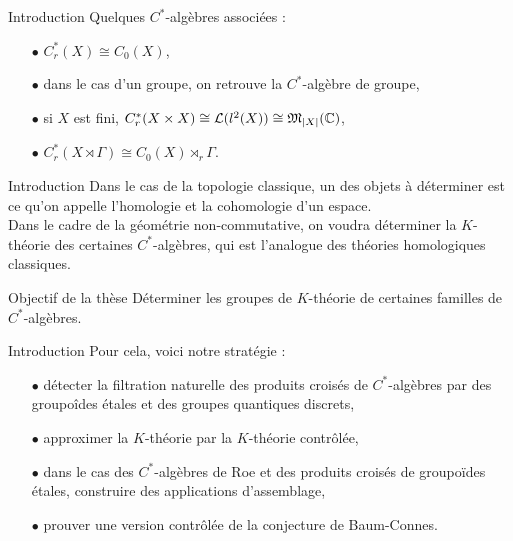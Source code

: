 \begin{frame}{Introduction}
Quelques $C^*$-algèbres associées :
\vspace{0.3 cm}
\begin{itemize}
\item[$\bullet$] $C_r^*(X)\cong C_0(X)$,
\vspace{0.3 cm}
\item[$\bullet$] dans le cas d'un groupe, on retrouve la $C^*$-algèbre de groupe,
\vspace{0.3 cm}
\item[$\bullet$] si $X$ est fini, $C^*_r(X\times X) \cong \mathcal L (l^2(X)) \cong \mathfrak M_{|X|}(\mathbb C)$,
\vspace{0.3 cm}
\item[$\bullet$] $C^*_r(X\rtimes \Gamma) \cong C_0(X)\rtimes_r \Gamma$.
\end{itemize}
\end{frame}

\begin{frame}{Introduction}
Dans le cas de la topologie classique, un des objets à déterminer est ce qu'on appelle l'homologie et la cohomologie d'un espace.\\
\vspace{0.3 cm}
Dans le cadre de la géométrie non-commutative, on voudra déterminer la $K$-théorie des certaines $C^*$-algèbres, qui est l'analogue des théories homologiques classiques. 
\vspace{0.3 cm}
\begin{block}{Objectif de la thèse}
Déterminer les groupes de $K$-théorie de certaines familles de $C^*$-algèbres.
\end{block}
\end{frame}

\begin{frame}{Introduction}
Pour cela, voici notre stratégie :\\
\vspace{0.3 cm}
\begin{itemize}
\item[$\bullet$] détecter la filtration naturelle des produits croisés de $C^*$-algèbres par des groupoîdes étales et des groupes quantiques discrets,
\vspace{0.3 cm}
\item[$\bullet$] approximer la $K$-théorie par la $K$-théorie contrôlée,
\vspace{0.3 cm}
\item[$\bullet$] dans le cas des $C^*$-algèbres de Roe et des produits croisés de groupoïdes étales, construire des applications d'assemblage,
\vspace{0.3 cm}
\item[$\bullet$] prouver une version contrôlée de la conjecture de Baum-Connes.
\end{itemize}
\end{frame}
